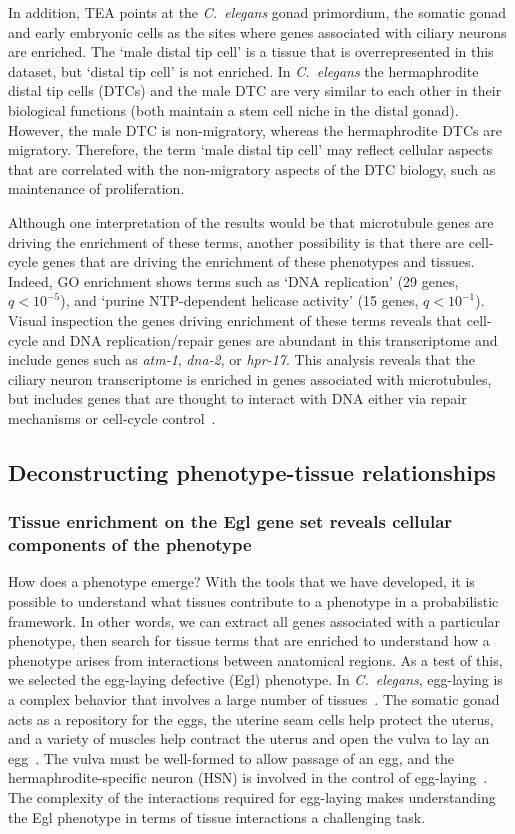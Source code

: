 \documentclass[10pt, onecolumn]{article}
\newcommand{\cel}{\emph{C.~elegans}}
\newcommand{\qval}[1]{\ensuremath{q<10^{-#1}}}
\begin{document}
In addition, TEA points at the \cel{} gonad primordium, the somatic gonad and
early embryonic cells as the sites where genes associated with ciliary neurons
are enriched. The `male distal tip cell' is a tissue that is overrepresented in
this dataset, but `distal tip cell' is not enriched. In \cel{} the hermaphrodite
distal tip cells (DTCs) and the male DTC are very similar to each other in their
biological functions (both maintain a stem cell niche in the distal gonad).
However, the male DTC is non-migratory, whereas the hermaphrodite DTCs are
migratory. Therefore, the term `male distal tip cell' may reflect cellular
aspects that are correlated with the non-migratory aspects of the DTC biology,
such as maintenance of proliferation.

Although one interpretation of the results would be that microtubule genes are
driving the enrichment of these terms, another possibility is that there are
cell-cycle genes that are driving the enrichment of these phenotypes and
tissues. Indeed, GO enrichment shows terms such as `DNA replication' (29 genes,
\qval{5}), and `purine NTP-dependent helicase activity' (15 genes, \qval{1}).
Visual inspection the genes driving enrichment of these terms reveals that
cell-cycle and DNA replication/repair genes are abundant in this transcriptome
and include genes such as \emph{atm-1}, \emph{dna-2}, or \emph{hpr-17}. This
analysis reveals that the ciliary neuron transcriptome is enriched in genes
associated with microtubules, but includes genes that are thought to interact
with DNA either via repair mechanisms or cell-cycle
control~\cite{Hofmann2000,Lee2003a,Bailly2010}.

\subsection*{Deconstructing phenotype-tissue relationships}
\subsubsection*{Tissue enrichment on the Egl gene set reveals cellular
components of the phenotype}
How does a phenotype emerge? With the tools that we have
developed, it is possible to understand what tissues contribute to a phenotype
in a probabilistic framework. In other words, we can extract all genes
associated with a particular phenotype, then search for tissue terms that are
enriched to understand how a phenotype arises from interactions between
anatomical regions. As a test of this, we selected the egg-laying defective
(Egl) phenotype. In \cel{}, egg-laying is a complex behavior that involves a
large number of tissues~\cite{Li1990}. The somatic gonad acts as a repository
for the eggs, the uterine seam cells help protect the uterus, and a variety of
muscles help contract the uterus and open the vulva to lay an
egg~\cite{Sulston1977}. The vulva must be well-formed to allow passage of an
egg, and the hermaphrodite-specific neuron (HSN) is involved in the control of
egg-laying~\cite{Schafer2005}. The complexity of the interactions required for
egg-laying makes understanding the Egl phenotype in terms of tissue interactions
a challenging task.
\end{document}
